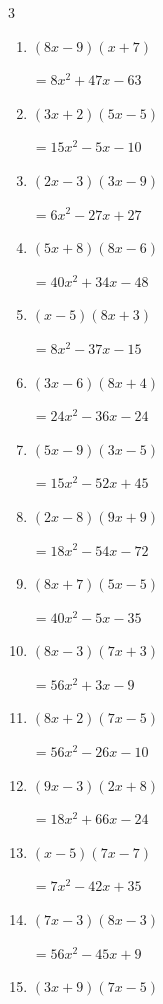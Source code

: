\begin{multicols}{3}
\begin{enumerate}
        $=24x^{2}-24$

\columnbreak %

  \item $(8x-9)(x+7)$

        $=8x^{2}+47x-63$

  \item $(3x+2)(5x-5)$

        $=15x^{2}-5x-10$

  \item $(2x-3)(3x-9)$

        $=6x^{2}-27x+27$

  \item $(5x+8)(8x-6)$

        $=40x^{2}+34x-48$

  \item $(x-5)(8x+3)$

        $=8x^{2}-37x-15$

  \item $(3x-6)(8x+4)$

        $=24x^{2}-36x-24$

  \item $(5x-9)(3x-5)$

        $=15x^{2}-52x+45$

  \item $(2x-8)(9x+9)$

        $=18x^{2}-54x-72$

  \item $(8x+7)(5x-5)$

        $=40x^{2}-5x-35$

  \item $(8x-3)(7x+3)$

        $=56x^{2}+3x-9$

  \item $(8x+2)(7x-5)$

        $=56x^{2}-26x-10$

  \item $(9x-3)(2x+8)$

        $=18x^{2}+66x-24$

  \item $(x-5)(7x-7)$

        $=7x^{2}-42x+35$

  \item $(7x-3)(8x-3)$

        $=56x^{2}-45x+9$

  \item $(3x+9)(7x-5)$


\end{enumerate}
\end{multicols}
